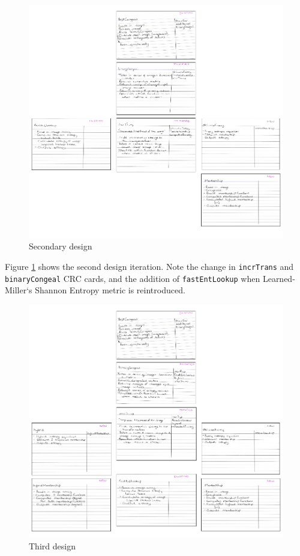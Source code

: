 \begin{figure}[H]
  \center
  \includegraphics[scale=0.5]{Appendix4/imgs/second.png}
  \caption{Secondary design}
  \label{fig:second-design}
\end{figure}

Figure \ref{fig:second-design} shows the second design iteration. Note the change in \texttt{incrTrans} and \texttt{binaryCongeal} CRC cards, and the addition of \texttt{fastEntLookup} when Learned-Miller`s Shannon Entropy metric is reintroduced.

\begin{figure}[H]
  \center
  \includegraphics[scale=0.5]{Appendix4/imgs/third.png}
  \caption{Third design}
  \label{fig:third-design}
\end{figure}

